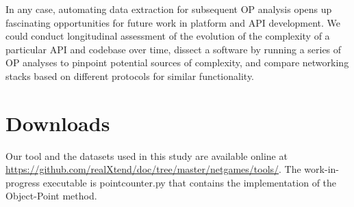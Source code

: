 \documentclass[conference]{IEEEtran}
\begin{document}
In any case, automating data extraction for subsequent OP analysis
opens up fascinating opportunities for future work in platform and API
development. We could conduct longitudinal assessment of the evolution
of the complexity of a particular API and codebase over time, dissect
a software by running a series of OP analyses to pinpoint potential
sources of complexity, and compare networking stacks based on
different protocols for similar functionality.


\section{Downloads%
  \label{downloads}%
}

Our tool and the datasets used in this study are available online at
\url{https://github.com/realXtend/doc/tree/master/netgames/tools/}. The
work-in-progress executable is pointcounter.py that contains the
implementation of the Object-Point method.


\end{document}
